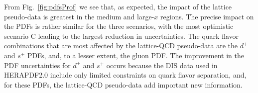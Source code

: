 From Fig.~\ref{fig:pdfsProf} we see that, as expected, the impact of the 
lattice pseudo-data is greatest in the medium and large-$x$ regions.
%
The precise impact on the PDFs is rather
similar for the three scenarios, with the most optimistic
scenario C leading to the largest reduction in uncertainties.
%
The quark flavor combinations that are most affected by the
lattice-QCD pseudo-data are the $d^{+}$ and $s^{+}$ PDFs,
and, to a lesser extent, the gluon PDF.
%
The improvement in the PDF uncertainties for $d^{+}$ and $s^{+}$
occurs because the DIS data
used in HERAPDF2.0 include only limited constraints
on quark flavor separation, and, for these PDFs, the lattice-QCD 
pseudo-data add important new information.

